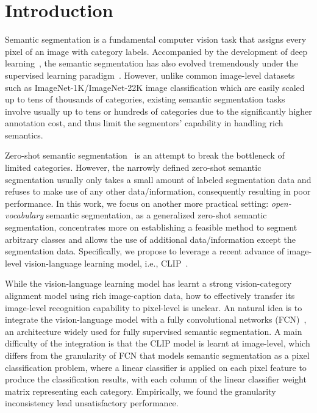\documentclass[runningheads]{llncs}
\begin{document}
\section{Introduction}
Semantic segmentation is a fundamental computer vision task that assigns every pixel of an image with category labels. Accompanied by the development of deep learning~\cite{NIPS2012_c399862d,simonyan2014very,he2016deep,dosovitskiy2020image,liu2021swin}, the semantic segmentation has also evolved tremendously under the supervised learning paradigm~\cite{long2015fully,chen2017deeplab,badrinarayanan2017segnet}. However, unlike common image-level datasets such as ImageNet-1K/ImageNet-22K image classification which are easily scaled up to tens of thousands of categories, existing semantic segmentation tasks involve usually up to tens or hundreds of categories due to the significantly higher annotation cost, and thus limit the segmentors' capability in handling rich semantics. 

Zero-shot semantic segmentation~\cite{bucher2019zero} is an attempt to break the bottleneck of limited categories. However, the narrowly defined zero-shot semantic segmentation usually only takes a small amount of labeled segmentation data and refuses to make use of any other data/information, consequently resulting in poor performance. In this work, we focus on another more practical setting: \emph{open-vocabulary} semantic segmentation, as a generalized zero-shot semantic segmentation, concentrates more on establishing a feasible method to segment arbitrary classes and allows the use of additional data/information except the segmentation data. Specifically, we propose to leverage a recent advance of image-level vision-language learning model, i.e., CLIP~\cite{radford2021learning}.

While the vision-language learning model has learnt a strong vision-category alignment model using rich image-caption data, how to effectively transfer its image-level recognition capability to pixel-level is unclear. An natural idea is to integrate the vision-language model with a fully convolutional networks (FCN)~\cite{long2015fully}, an architecture widely used for fully supervised semantic segmentation. A main difficulty of the integration is that the CLIP model is learnt at image-level, which differs from the granularity of FCN that models semantic segmentation as a pixel classification problem, where a linear classifier is applied on each pixel feature to produce the classification results, with each column of the linear classifier weight matrix representing each category. Empirically, we found the granularity inconsistency lead unsatisfactory performance.
\end{document}
